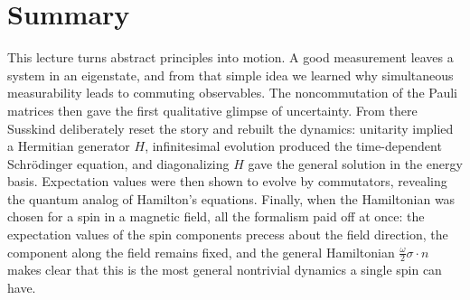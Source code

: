 \section{Summary}

This lecture turns abstract principles into motion. A good measurement leaves a system in an eigenstate, and from that simple idea we learned why simultaneous measurability leads to commuting observables. The noncommutation of the Pauli matrices then gave the first qualitative glimpse of uncertainty. From there Susskind deliberately reset the story and rebuilt the dynamics: unitarity implied a Hermitian generator \(H\), infinitesimal evolution produced the time-dependent Schr\"odinger equation, and diagonalizing \(H\) gave the general solution in the energy basis. Expectation values were then shown to evolve by commutators, revealing the quantum analog of Hamilton's equations. Finally, when the Hamiltonian was chosen for a spin in a magnetic field, all the formalism paid off at once: the expectation values of the spin components precess about the field direction, the component along the field remains fixed, and the general Hamiltonian \(\frac{\omega}{2}\sigma\cdot n\) makes clear that this is the most general nontrivial dynamics a single spin can have.